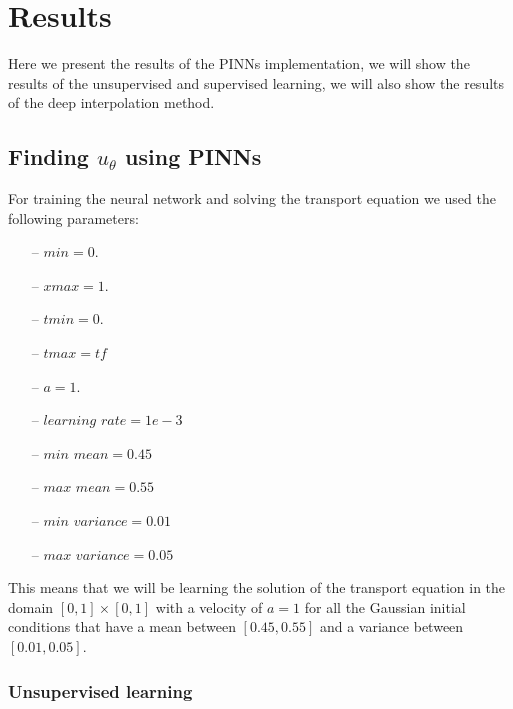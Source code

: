 \documentclass{article}
\begin{document}
\section{Results}

Here we present the results of the PINNs implementation, we will show the results of the unsupervised and supervised learning, we will also show the results of the deep interpolation method.

\subsection{Finding $u_\theta$ using PINNs}

For training the neural network and solving the transport equation we used the following parameters:

\begin{itemize}
    \item[--] $min = 0.$
    \item[--] $xmax = 1.$
    \item[--] $tmin = 0.$
    \item[--] $tmax = tf$
    \item[--] $a = 1.$
    \item[--] $learning$ $rate = 1e-3$
    \item[--] $min$ $mean = 0.45$
    \item[--] $max$ $mean = 0.55$
    \item[--] $min$ $variance = 0.01$
    \item[--] $max$ $variance = 0.05$
\end{itemize}

This means that we will be learning the solution of the transport equation in the domain $[0,1] \times [0,1]$ with a velocity of $a=1$ for all the Gaussian initial conditions that have a mean between $[0.45,0.55]$ and a variance between $[0.01,0.05]$.

\subsubsection{Unsupervised learning}


\end{document}
